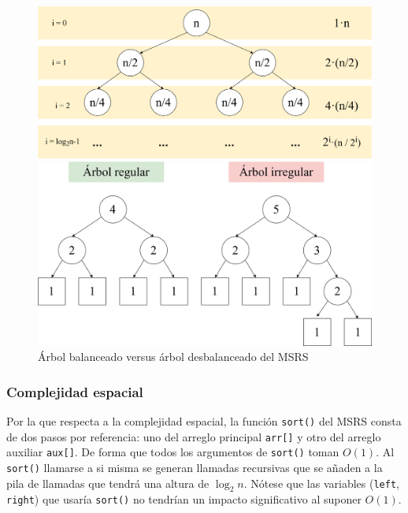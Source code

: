 \documentclass[titlepage]{article}
\begin{document}
\begin{figure}[h]
\centering 
\captionsetup{justification=centering, margin=10pt}
\begin{minipage}{0.5\textwidth} 
    \centering 
    \includegraphics[width=0.95\linewidth]{Diagrames/arbolBinarioLenght.png} 
    \caption{Tamaño de la entrada a lo largo de las llamadas a \lstinline{sort()}} 
    \label{fig:entradaMSRS}
\end{minipage}\hfill 
\begin{minipage}{0.5\textwidth} 
    \centering 
    \includegraphics[width=0.95\linewidth]{Diagrames/arbolBinario_MSRS.png} 
    \caption{Árbol balanceado versus árbol desbalanceado del MSRS} 
    \label{fig:simetriaMSRS}
\end{minipage} \end{figure}

\subsubsection{Complejidad espacial}
Por la que respecta a la complejidad espacial, la función \lstinline|sort()| del MSRS consta de dos pasos por referencia: uno del arreglo principal \lstinline|arr[]| y otro del arreglo auxiliar \lstinline|aux[]|. De forma que todos los argumentos de \lstinline|sort()| toman \(O(1)\). Al \lstinline|sort()| llamarse a si misma se generan llamadas recursivas que se añaden a la pila de llamadas que tendrá una altura de \(\log_{2}n\). Nótese que las variables (\lstinline|left|, \lstinline|right|) que usaría \lstinline|sort()| no tendrían un impacto significativo al suponer \(O(1)\). 
\end{document}
